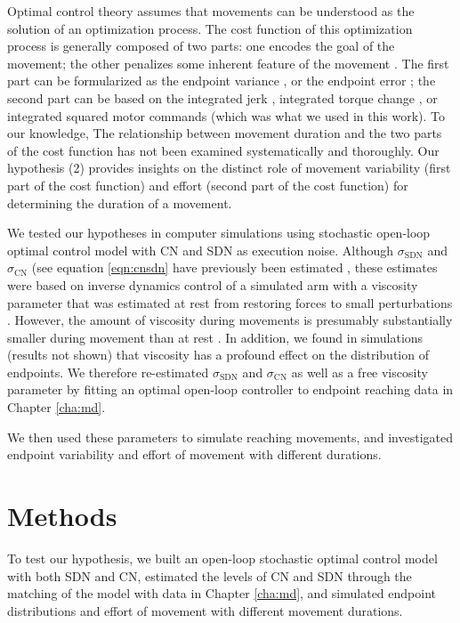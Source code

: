 Optimal control theory assumes that movements can be understood as the solution of an optimization process.
The cost function of this optimization process is generally composed of two parts: one encodes the goal of the movement; the other penalizes some inherent feature of the movement \cite{Diedrichsen2010}. 
The first part can be formularized as the endpoint variance \cite{Harris1998}, or the endpoint error \cite{Todorov2005}; 
the second part can be based on the integrated jerk \cite{Flash1985}, integrated torque change \cite{Uno1989}, or integrated squared motor commands \cite{Todorov2002} (which was what we used in this work). 
To our knowledge, The relationship between movement duration and the two parts of the cost function has not been examined systematically and thoroughly.
Our hypothesis (2) provides insights on the distinct role of movement variability (first part of the cost function) and effort (second part of the cost function) for determining the duration of a movement.

We tested our hypotheses in computer simulations using stochastic open-loop optimal control \cite{Todorov2005} model with CN and SDN as execution noise.  
Although $\sigma_{\text{SDN}}$ and $\sigma_{\text{CN}}$ (see equation \ref{eqn:cnsdn} have previously been estimated \cite{VanBeers2004}, these estimates were based on inverse dynamics control of a simulated arm with a viscosity parameter that was estimated at rest from restoring forces to small perturbations \cite{Gomi1998}. 
However, the amount of viscosity during movements is presumably substantially smaller during movement than at rest \cite{Burdet2013}. 
In addition, we found in simulations (results not shown) that viscosity has a profound effect on the distribution of endpoints.  
We therefore re-estimated $\sigma_{\text{SDN}}$ and $\sigma_{\text{CN}}$ as well as a free viscosity parameter by fitting an optimal open-loop controller to endpoint reaching data in Chapter \ref{cha:md}.

We then used these parameters to simulate reaching movements, and investigated endpoint variability and effort of movement with different durations.

\section{Methods}
To test our hypothesis, we built an open-loop stochastic optimal control model with both SDN and CN, estimated the levels of CN and SDN through the matching of the model with data in Chapter \ref{cha:md}, and simulated endpoint distributions and effort of movement with different movement durations.

